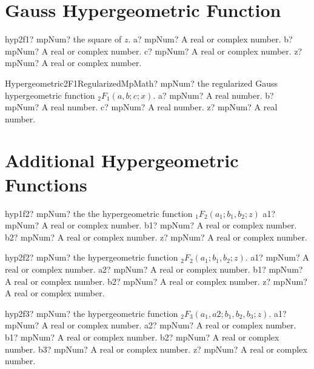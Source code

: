 \documentclass[12pt,a4paper,openany]{book}
\begin{document}
\section{Gauss Hypergeometric Function}

\begin{mpFunctionsExtract}
\mpFunctionFour
{hyp2f1? mpNum? the square of $z$.}
{a? mpNum? A real or complex number.}
{b? mpNum? A real or complex number.}
{c? mpNum? A real or complex number.}
{z? mpNum? A real or complex number.}
\end{mpFunctionsExtract}

\begin{mpFunctionsExtract}
\mpFunctionFourNotImplemented
{Hypergeometric2F1RegularizedMpMath? mpNum? the regularized Gauss hypergeometric function ${}_2F_1(a, b; c; x)$.}
{a? mpNum? A real number.}
{b? mpNum? A real number.}
{c? mpNum? A real number.}
{z? mpNum? A real number.}
\end{mpFunctionsExtract}

\section{Additional Hypergeometric Functions}

\begin{mpFunctionsExtract}
\mpFunctionFour
{hyp1f2? mpNum? the the hypergeometric function ${}_1F_2(a_1; b_1, b_2; z)$}
{a1? mpNum? A real or complex number.}
{b1? mpNum? A real or complex number.}
{b2? mpNum? A real or complex number.}
{z? mpNum? A real or complex number.}
\end{mpFunctionsExtract}

\begin{mpFunctionsExtract}
\mpFunctionFive
{hyp2f2? mpNum? the hypergeometric function  ${}_2F_2(a_1; b_1, b_2; z)$.}
{a1? mpNum? A real or complex number.}
{a2? mpNum? A real or complex number.}
{b1? mpNum? A real or complex number.}
{b2? mpNum? A real or complex number.}
{z? mpNum? A real or complex number.}
\end{mpFunctionsExtract}

\begin{mpFunctionsExtract}
\mpFunctionSix
{hyp2f3? mpNum? the hypergeometric function ${}_2F_3(a_1,a2;b_1,b_2,b_3;z)$.}
{a1? mpNum? A real or complex number.}
{a2? mpNum? A real or complex number.}
{b1? mpNum? A real or complex number.}
{b2? mpNum? A real or complex number.}
{b3? mpNum? A real or complex number.}
{z? mpNum? A real or complex number.}
\end{mpFunctionsExtract}
\end{document}
